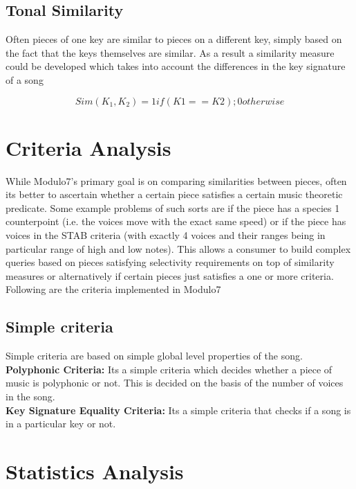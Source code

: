 \subsection{Tonal Similarity}

\noindent Often pieces of one key are similar to pieces on a different key, simply based on the fact that the keys themselves are similar. As a result a similarity measure could be developed which takes into account the differences in the key signature of a song

\begin{equation}
Sim(K_1, K_2) = 1 if (K1 == K2) ; 0 otherwise
\end{equation}


\section{Criteria Analysis} \label{criteria}

\noindent While Modulo7's primary goal is on comparing similarities between pieces, often its better to ascertain whether a certain piece satisfies a certain music theoretic predicate. Some example problems of such sorts are if the piece has a species 1 counterpoint (i.e. the voices move with the exact same speed) or if the piece has voices in the STAB criteria (with exactly 4 voices and their ranges being in particular range of high and low notes). This allows a consumer to build complex queries based on pieces satisfying selectivity requirements on top of similarity measures or alternatively if certain pieces just satisfies a one or more criteria. Following are the criteria implemented in Modulo7

\subsection{Simple criteria} 

\noindent Simple criteria are based on simple global level properties of the song. \\

\noindent \textbf{Polyphonic Criteria:} Its a simple criteria which decides whether a piece of music is polyphonic or not. This is decided on the basis of the number of voices in the song. \\

\noindent \textbf{Key Signature Equality Criteria:} Its a simple criteria that checks if a song is in a particular key or not.

\section{Statistics Analysis} \label{statistic}


